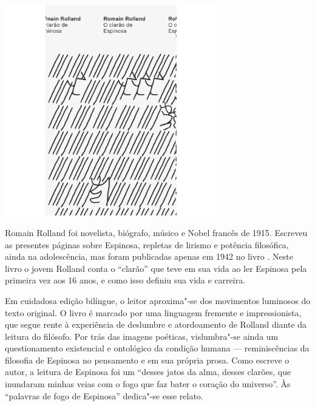 \pagebreak


\begin{center}
\hspace*{-2.5cm}
\hspace*{2.5cm}\includegraphics[width=92mm]{./grid/rolland.png}
\end{center}

\hspace*{-7cm}\hrulefill\hspace*{-7cm}

\medskip

\noindent{}Romain Rolland foi novelista, biógrafo, músico e Nobel francês de 1915. Escreveu as presentes páginas sobre Espinosa, repletas de lirismo e potência filosófica, ainda na adolescência, mas foram publicadas apenas em 1942 no livro {}. Neste livro o jovem Rolland conta o “clarão” que teve em sua vida ao ler Espinosa pela primeira vez aos 16 anos, e como isso definiu sua vida e carreira.

Em cuidadosa edição bilíngue, o leitor aproxima"-se dos movimentos luminosos do texto original. O livro é marcado por uma linguagem fremente e impressionista, que segue rente à experiência de deslumbre e atordoamento de Rolland diante da leitura do filósofo. Por trás das imagens poéticas, vislumbra"-se ainda um questionamento existencial e ontológico da condição humana --- reminiscências da filosofia de Espinosa no pensamento e em sua própria prosa. Como escreve o autor, a leitura de Espinosa foi um “desses jatos da alma, desses clarões, que inundaram minhas veias com o fogo que faz bater o coração do universo”. Às “palavras de fogo de Espinosa” dedica"-se esse relato.

